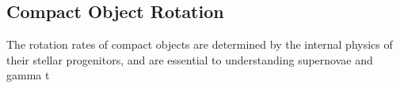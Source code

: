 {\color{orange}

\subsection{Compact Object Rotation}

The rotation rates of compact objects are determined by the internal physics of their stellar progenitors, and are essential to understanding supernovae and gamma t

}